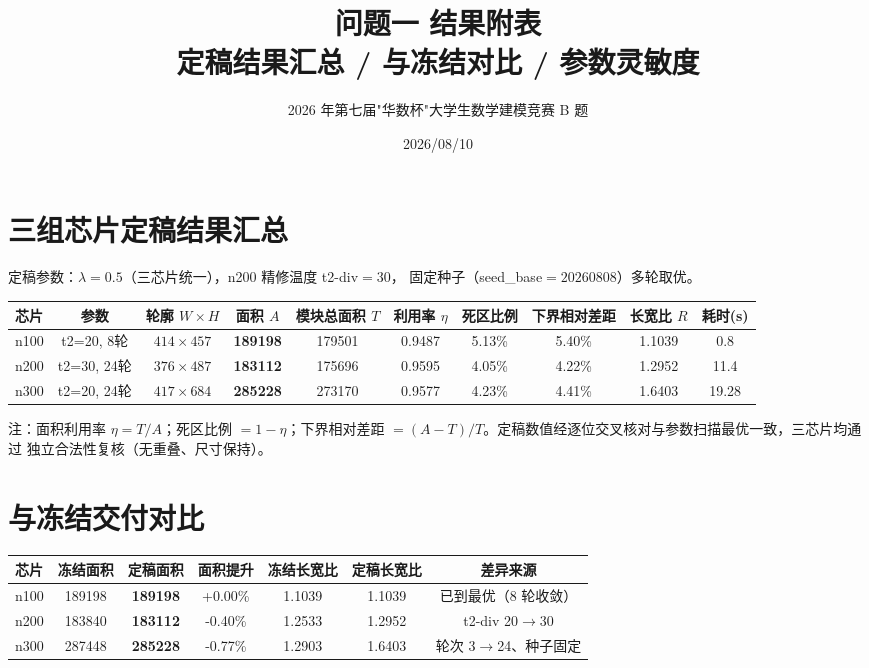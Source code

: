 \documentclass[12pt,a4paper]{article}
\title{\textbf{问题一 结果附表}\\[6pt]
\large 定稿结果汇总 / 与冻结对比 / 参数灵敏度}
\author{2026 年第七届"华数杯"大学生数学建模竞赛 B 题}
\date{2026/08/10}
\begin{document}
\maketitle

\section{三组芯片定稿结果汇总}

定稿参数：$\lambda = 0.5$（三芯片统一），n200 精修温度 t2-div$=30$，
固定种子（seed\_base$=20260808$）多轮取优。

\begin{table}[H]
\centering
\scriptsize
\setlength{\tabcolsep}{2.5pt}
\begin{tabular}{lccccccccc}
\toprule
芯片 & 参数 & 轮廓 $W\times H$ & 面积 $A$ & 模块总面积 $T$ & 利用率 $\eta$ & 死区比例 & 下界相对差距 & 长宽比 $R$ & 耗时(s) \\
\midrule

n100 & t2=20, 8轮 & $414\times457$ & \textbf{189198} & 179501 & 0.9487 & 5.13\% & 5.40\% & 1.1039 & 0.8 \\
n200 & t2=30, 24轮 & $376\times487$ & \textbf{183112} & 175696 & 0.9595 & 4.05\% & 4.22\% & 1.2952 & 11.4 \\
n300 & t2=20, 24轮 & $417\times684$ & \textbf{285228} & 273170 & 0.9577 & 4.23\% & 4.41\% & 1.6403 & 19.28 \\
\bottomrule
\end{tabular}
\end{table}

注：面积利用率 $\eta = T/A$；死区比例 $= 1-\eta$；下界相对差距
$= (A-T)/T$。定稿数值经逐位交叉核对与参数扫描最优一致，三芯片均通过
独立合法性复核（无重叠、尺寸保持）。

\section{与冻结交付对比}

\begin{table}[H]
\centering
\scriptsize
\setlength{\tabcolsep}{3pt}
\begin{tabular}{lcccccc}
\toprule
芯片 & 冻结面积 & 定稿面积 & 面积提升 & 冻结长宽比 & 定稿长宽比 & 差异来源 \\
\midrule

n100 & 189198 & \textbf{189198} & +0.00\% & 1.1039 & 1.1039 & 已到最优（8 轮收敛） \\
n200 & 183840 & \textbf{183112} & -0.40\% & 1.2533 & 1.2952 & t2-div 20$\to$30 \\
n300 & 287448 & \textbf{285228} & -0.77\% & 1.2903 & 1.6403 & 轮次 3$\to$24、种子固定 \\
\bottomrule
\end{tabular}
\end{table}
\end{document}
